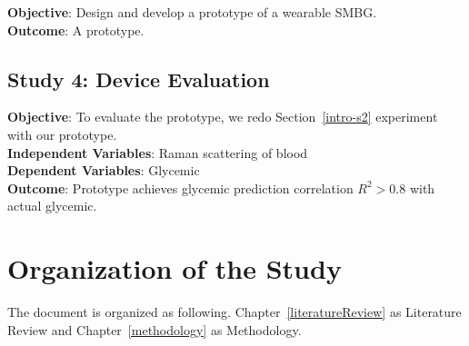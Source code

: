 \textbf{Objective}: Design and develop a prototype of a wearable SMBG.\\
\textbf{Outcome}: A prototype.




\subsection{Study 4: Device Evaluation}

\textbf{Objective}: To evaluate the prototype, we redo Section~\ref{intro-s2} experiment with our prototype.\\
\textbf{Independent Variables}: Raman scattering of blood\\
\textbf{Dependent Variables}: Glycemic\\
\textbf{Outcome}: Prototype achieves glycemic prediction correlation $R^2 > 0.8$ with actual glycemic.




\section{Organization of the Study}

The document is organized as following. Chapter~\ref{literatureReview} as Literature Review and Chapter~\ref{methodology} as Methodology.
